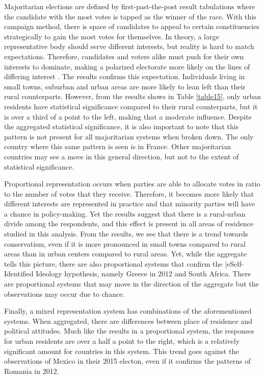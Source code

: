 \documentclass[12pt, titlepage]{article}
\begin{document}
Majoritarian elections are defined by first-past-the-post result tabulations where the candidate with the most votes is tapped as the winner of the race. With this campaign method, there is space of candidates to appeal to certain constituencies strategically to gain the most votes for themselves. In theory, a large representative body should serve different interests, but reality is hard to match expectations. Therefore, candidates and voters alike must push for their own interests to dominate, making a polarized electorate more likely on the lines of differing interest \cite{abramowitz-2010}. The results confirms this expectation. Individuals living in small towns, suburban and urban areas are more likely to lean left than their rural counterparts. However, from the results shows in Table \ref{table15}, only urban residents have statistical significance compared to their rural counterparts, but it is over a third of a point to the left, making that a moderate influence. Despite the aggregated statistical significance, it is also important to note that this pattern is not present for all majoritarian systems when broken down. The only country where this same pattern is seen is in France. Other majoritarian countries may see a move in this general direction, but not to the extent of statistical significance.

Proportional representation occurs when parties are able to allocate votes in ratio to the number of votes that they receive. Therefore, it becomes more likely that different interests are represented in practice and that minority parties will have a chance in policy-making. Yet the results suggest that there is a rural-urban divide among the respondents, and this effect is present in all areas of residence studied in this analysis. From the results, we see that there is a trend towards conservatism, even if it is more pronounced in small towns compared to rural areas than in urban centers compared to rural areas. Yet, while the aggregate tells this picture, there are also proportional systems that confirm the |e{Self-Identified Ideology} hypothesis, namely Greece in 2012 and South Africa. There are proportional systems that may move in the direction of the aggregate but the observations may occur due to chance.

Finally, a mixed representation system has combinations of the aforementioned systems. When aggregated, there are differences between place of residence and political attitudes. Much like the results in a proportional system, the responses for urban residents are over a half a point to the right, which is a relatively significant amount for countries in this system. This trend goes against the observations of Mexico in their 2015 electon, even if it confirms the patterns of Romania in 2012. 
\end{document}
